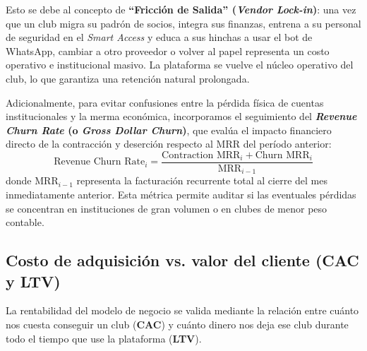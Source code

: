 Esto se debe al concepto de \textbf{``Fricción de Salida'' (\textit{Vendor Lock-in})}: una vez que un club migra su padrón de socios, integra sus finanzas, entrena a su personal de seguridad en el \textit{Smart Access} y educa a sus hinchas a usar el bot de WhatsApp, cambiar a otro proveedor o volver al papel representa un costo operativo e institucional masivo. La plataforma se vuelve el núcleo operativo del club, lo que garantiza una retención natural prolongada.

Adicionalmente, para evitar confusiones entre la pérdida física de cuentas institucionales y la merma económica, incorporamos el seguimiento del \textbf{\textit{Revenue Churn Rate} (o \textit{Gross Dollar Churn})}, que evalúa el impacto financiero directo de la contracción y deserción respecto al MRR del período anterior:
\begin{equation}
    \text{Revenue Churn Rate}_i = \frac{\text{Contraction MRR}_i + \text{Churn MRR}_i}{\text{MRR}_{i-1}}
\end{equation}
donde $\text{MRR}_{i-1}$ representa la facturación recurrente total al cierre del mes inmediatamente anterior. Esta métrica permite auditar si las eventuales pérdidas se concentran en instituciones de gran volumen o en clubes de menor peso contable.

\subsection{Costo de adquisición vs. valor del cliente (CAC y LTV)}

La rentabilidad del modelo de negocio se valida mediante la relación entre cuánto nos cuesta conseguir un club (\textbf{CAC}) y cuánto dinero nos deja ese club durante todo el tiempo que use la plataforma (\textbf{LTV}).

